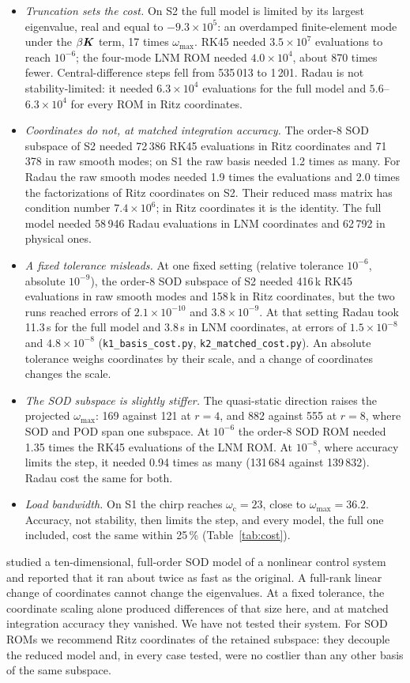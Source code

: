 \documentclass[11pt]{article}
\begin{document}
\begin{itemize}
\item \emph{Truncation sets the cost.} On S2 the full model is limited by its largest eigenvalue, real and equal to $-9.3\times10^5$: an overdamped finite-element mode under the $\beta\bm{K}$ term, 17 times $\omega_{\max}$. RK45 needed $3.5\times10^7$ evaluations to reach $10^{-6}$; the four-mode LNM ROM needed $4.0\times10^4$, about 870 times fewer. Central-difference steps fell from 535\,013 to 1\,201. Radau is not stability-limited: it needed $6.3\times10^4$ evaluations for the full model and $5.6$--$6.3\times10^4$ for every ROM in Ritz coordinates.
\item \emph{Coordinates do not, at matched integration accuracy.} The order-8 SOD subspace of S2 needed 72\,386 RK45 evaluations in Ritz coordinates and 71\,378 in raw smooth modes; on S1 the raw basis needed 1.2 times as many. For Radau the raw smooth modes needed 1.9 times the evaluations and 2.0 times the factorizations of Ritz coordinates on S2. Their reduced mass matrix has condition number $7.4\times10^6$; in Ritz coordinates it is the identity. The full model needed 58\,946 Radau evaluations in LNM coordinates and 62\,792 in physical ones.
\item \emph{A fixed tolerance misleads.} At one fixed setting (relative tolerance $10^{-6}$, absolute $10^{-9}$), the order-8 SOD subspace of S2 needed 416\,k RK45 evaluations in raw smooth modes and 158\,k in Ritz coordinates, but the two runs reached errors of $2.1\times10^{-10}$ and $3.8\times10^{-9}$. At that setting Radau took 11.3\,s for the full model and 3.8\,s in LNM coordinates, at errors of $1.5\times10^{-8}$ and $4.8\times10^{-8}$ (\texttt{k1\_basis\_cost.py}, \texttt{k2\_matched\_cost.py}). An absolute tolerance weighs coordinates by their scale, and a change of coordinates changes the scale.
\item \emph{The SOD subspace is slightly stiffer.} The quasi-static direction raises the projected $\omega_{\max}$: 169 against 121 at $r=4$, and 882 against 555 at $r=8$, where SOD and POD span one subspace. At $10^{-6}$ the order-8 SOD ROM needed 1.35 times the RK45 evaluations of the LNM ROM. At $10^{-8}$, where accuracy limits the step, it needed 0.94 times as many (131\,684 against 139\,832). Radau cost the same for both.
\item \emph{Load bandwidth.} On S1 the chirp reaches $\omega_{\mathrm c}=23$, close to $\omega_{\max}=36.2$. Accuracy, not stability, then limits the step, and every model, the full one included, cost the same within 25\,\% (Table~\ref{tab:cost}).
\end{itemize}
\citet{Ilbeigi2018} studied a ten-dimensional, full-order SOD model of a nonlinear control system and reported that it ran about twice as fast as the original. A full-rank linear change of coordinates cannot change the eigenvalues. At a fixed tolerance, the coordinate scaling alone produced differences of that size here, and at matched integration accuracy they vanished. We have not tested their system.
For SOD ROMs we recommend Ritz coordinates of the retained subspace: they decouple the reduced model and, in every case tested, were no costlier than any other basis of the same subspace.



\end{document}
